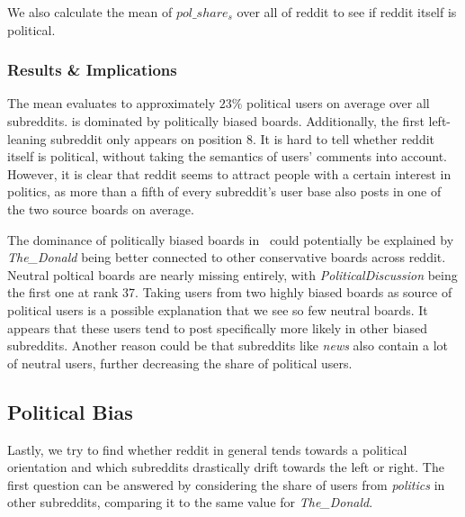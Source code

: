 \documentclass[runningheads,a4paper]{llncs}
\begin{document}
	We also calculate the mean of $pol\_share_s$ over all of reddit to see if reddit itself is political.
	
	\subsubsection{Results \& Implications}
	The mean evaluates to approximately $23\%$ political users on average over all subreddits.  is dominated by politically biased boards. Additionally, the first left-leaning subreddit only appears on position 8.
	It is hard to tell whether reddit itself is political, without taking the semantics of users' comments into account. However, it is clear that reddit seems to attract people with a certain interest in politics, as more than a fifth of every subreddit's user base also posts in one of the two source boards on average.
	
	
	The dominance of politically biased boards in~ could potentially be explained by \textit{The\_Donald} being better connected to other conservative boards across reddit. Neutral poltical boards are nearly missing entirely, with \textit{PoliticalDiscussion} being the first one at rank 37. Taking users from two highly biased boards as source of political users is a possible explanation that we see so few neutral boards. It appears that these users tend to post specifically more likely in other biased subreddits. Another reason could be that subreddits like \textit{news} also contain a lot of neutral users, further decreasing the share of political users.
	
	
	\subsection{Political Bias}\label{sub:cross_subreddit_pol_bias}
	
	Lastly, we try to find whether reddit in general tends towards a political orientation and which subreddits drastically drift towards the left or right. The first question can be answered by considering the share of users from \textit{politics} in other subreddits, comparing it to the same value for \textit{The\_Donald}.
	
\end{document}
